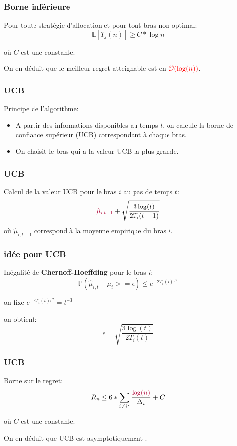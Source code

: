 \documentclass[compress, color = usenames, dvipsnames]{beamer}
\begin{document}
\begin{frame}
    \frametitle{Borne inférieure}


    Pour toute stratégie d'allocation et pour tout bras non optimal:
    $$\mathbb{E} [T_j(n)] \ge C*\log n$$

    où $C$ est une constante.

    On en déduit que le meilleur regret atteignable est en ${\color{red} \mathcal{O}( \log(n))}$.

    \hfill \cite{lai1985asymptotically}

\end{frame}




\begin{frame}
    \frametitle{UCB}
    Principe de l'algorithme:
    \begin{itemize}
        \item A partir des informations disponibles au temps $t$, on calcule la borne de confiance supérieur (UCB) correspondant à chaque bras.
        \item On choisit le bras qui a la valeur UCB la plus grande.
    \end{itemize}
    \hfill \cite{auer2002finite}
\end{frame}

\begin{frame}
    \frametitle{UCB}
    Calcul de la valeur UCB pour le bras $i$ au pas de temps $t$:
    $$ \red{ \hat{\mu}_{i,t-1}} +  \sqrt{\frac{3\log(t)}{2T_i(t-1)}} $$
    où $\hat{\mu}_{i,t-1} $ correspond à la moyenne empirique du bras $i$.
    
\end{frame}

\begin{frame}
    \frametitle{idée pour UCB}

    Inégalité de \textbf{Chernoff-Hoeffding} pour le bras $i$:
    $$ \mathbb{P}(\hat{\mu}_{i,t} - \mu_i >= \epsilon) \le e^{-2T_i(t) \epsilon^2}$$
    

    on fixe $e^{-2T_i(t) \epsilon^2}=t^{-3}$

    on obtient: 
    $$\epsilon=\sqrt{\frac{3\log(t)}{2T_i(t)}}$$


    
\end{frame}

\begin{frame}
    \frametitle{UCB}
    Borne sur le regret:
    $$ R_n \le 6*\sum_{i \ne i^*}\frac{\red{\log(n)}}{\Delta_i} + C $$
    
    où $C$ est une constante.

    On en déduit que UCB est asymptotiquement .
\end{frame}
\end{document}
